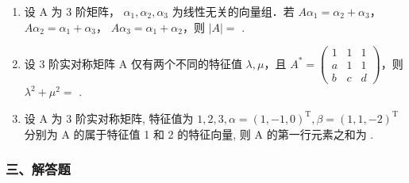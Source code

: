 \documentclass[12pt, a4paper]{ctexart}
\begin{document}
\begin{enumerate}[start=10]
    \item 设 A 为 3 阶矩阵， $ \alpha_1, \alpha_2, \alpha_3 $ 为线性无关的向量组．若 $ A\alpha_1 = \alpha_2 + \alpha_3 $， $ A\alpha_2 = \alpha_1 + \alpha_3 $， $ A\alpha_3 = \alpha_1 + \alpha_2 $，则 $ |A| = $ \underline{\hspace{2cm}}.

    \item 设 3 阶实对称矩阵 A 仅有两个不同的特征值 $ \lambda, \mu $，且 $ A^* = \begin{pmatrix} 1 & 1 & 1 \\ a & 1 & 1 \\ b & c & d \end{pmatrix} $，则 $ \lambda^2 + \mu^2 = $ \underline{\hspace{2cm}}.

    \item 设 A 为 3 阶实对称矩阵, 特征值为 $ 1, 2, 3, \alpha = (1, -1, 0)^{\mathrm{T}}, \beta = (1, 1, -2)^{\mathrm{T}} $ 分别为 A 的属于特征值 1 和 2 的特征向量, 则 A 的第一行元素之和为 \underline{\hspace{2cm}}.
\end{enumerate}

\subsubsection*{三、解答题}
\end{document}
